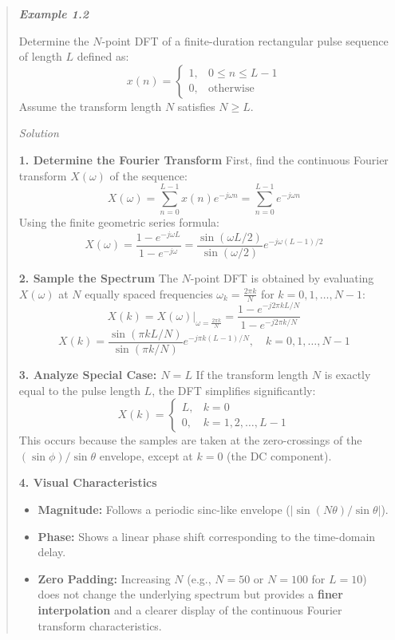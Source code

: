 \begin{quote}
\textbf{\emph{Example 1.2}}

Determine the \(N\)-point DFT of a finite-duration rectangular pulse
sequence of length \(L\) defined as:
\[x(n) = \begin{cases} 1, & 0 \leq n \leq L-1 \\ 0, & \text{otherwise} \end{cases}\]
Assume the transform length \(N\) satisfies \(N \ge L\).

\emph{Solution}

\textbf{1. Determine the Fourier Transform} First, find the continuous
Fourier transform \(X(\omega)\) of the sequence:
\[X(\omega) = \sum_{n=0}^{L-1} x(n)e^{-j\omega n} = \sum_{n=0}^{L-1} e^{-j\omega n}\]
Using the finite geometric series formula:
\[X(\omega) = \frac{1- e^{-j\omega L}}{1- e^{-j\omega}} = \frac{\sin(\omega L/2)}{\sin(\omega/2)} e^{-j\omega(L-1)/2}\]

\textbf{2. Sample the Spectrum} The \(N\)-point DFT is obtained by
evaluating \(X(\omega)\) at \(N\) equally spaced frequencies
\(\omega_k = \frac{2\pi k}{N}\) for \(k = 0, 1, \dots, N-1\):
\[X(k) = X(\omega) \Big|_{\omega = \frac{2\pi k}{N}} = \frac{1- e^{-j2\pi kL/N}}{1- e^{-j2\pi k/N}}\]
\[X(k) = \frac{\sin(\pi kL/N)}{\sin(\pi k/N)} e^{-j\pi k(L-1)/N}, \quad k = 0, 1, \dots, N-1\]

\textbf{3. Analyze Special Case: \(N = L\)} If the transform length
\(N\) is exactly equal to the pulse length \(L\), the DFT simplifies
significantly:
\[X(k) = \begin{cases} L, & k = 0 \\ 0, & k = 1, 2, \dots, L-1 \end{cases}\]
This occurs because the samples are taken at the zero-crossings of the
\((\sin \phi)/\sin \theta\) envelope, except at \(k=0\) (the DC
component).

\textbf{4. Visual Characteristics}

\begin{itemize}
\tightlist
\item
  \textbf{Magnitude:} Follows a periodic sinc-like envelope
  (\(| \sin(N \theta) / \sin \theta |\)).
\item
  \textbf{Phase:} Shows a linear phase shift corresponding to the
  time-domain delay.
\item
  \textbf{Zero Padding:} Increasing \(N\) (e.g., \(N=50\) or \(N=100\)
  for \(L=10\)) does not change the underlying spectrum but provides a
  \textbf{finer interpolation} and a clearer display of the continuous
  Fourier transform characteristics.
\end{itemize}
\end{quote}

